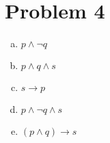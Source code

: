 \section*{Problem 4}


\begin{sol}
    \begin{enumerate}[(a)]
        \item $p\land\lnot q$
        \item $p\land q\land s$
        \item $s\to p$
        \item $p\land\lnot q\land s$
        \item $(p\land q)\to s$
    \end{enumerate}
\end{sol}
